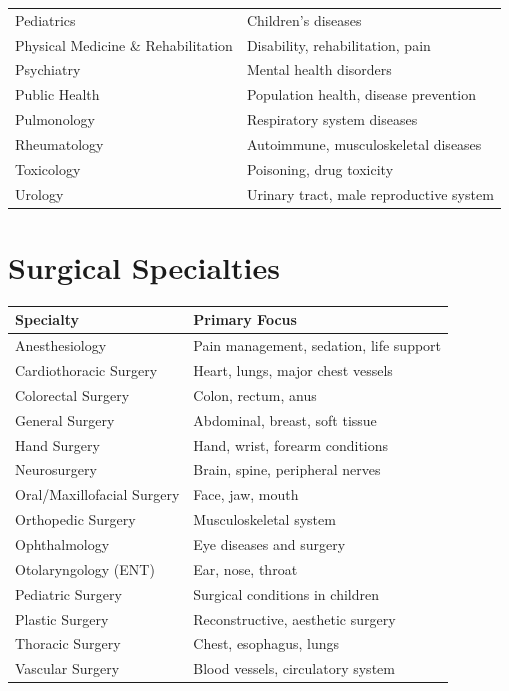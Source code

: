 \begin{tabularx}{\textwidth}{@{}lX@{}}
Pediatrics & Children's diseases \\
Physical Medicine \& Rehabilitation & Disability, rehabilitation, pain \\
Psychiatry & Mental health disorders \\
Public Health & Population health, disease prevention \\
Pulmonology & Respiratory system diseases \\
Rheumatology & Autoimmune, musculoskeletal diseases \\
Toxicology & Poisoning, drug toxicity \\
Urology & Urinary tract, male reproductive system \\
\bottomrule
\end{tabularx}

\section*{Surgical Specialties}

\begin{tabularx}{\textwidth}{@{}lX@{}}
\toprule
\textbf{Specialty} & \textbf{Primary Focus} \\
\midrule
Anesthesiology & Pain management, sedation, life support \\
Cardiothoracic Surgery & Heart, lungs, major chest vessels \\
Colorectal Surgery & Colon, rectum, anus \\
General Surgery & Abdominal, breast, soft tissue \\
Hand Surgery & Hand, wrist, forearm conditions \\
Neurosurgery & Brain, spine, peripheral nerves \\
Oral/Maxillofacial Surgery & Face, jaw, mouth \\
Orthopedic Surgery & Musculoskeletal system \\
Ophthalmology & Eye diseases and surgery \\
Otolaryngology (ENT) & Ear, nose, throat \\
Pediatric Surgery & Surgical conditions in children \\
Plastic Surgery & Reconstructive, aesthetic surgery \\
Thoracic Surgery & Chest, esophagus, lungs \\
Vascular Surgery & Blood vessels, circulatory system \\
\bottomrule
\end{tabularx}

